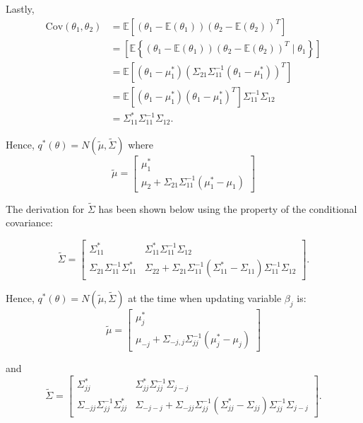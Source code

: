 \noindent Lastly,
$$
\begin{array}{rl}
	\mbox{Cov}(\theta_1,\theta_2) 
	&  = \mathbb{E}[(\theta_1 - \mathbb{E}(\theta_1))(\theta_2 - \mathbb{E}(\theta_2))^T] 
	\\ [2ex]
	&  = \left[ \mathbb{E}\left\{ (\theta_1 - \mathbb{E}(\theta_1))(\theta_2 - \mathbb{E}(\theta_2))^T \mid \theta_1 \right\} \right]     \\ [2ex]
	& = \mathbb{E}\left[ \left(\theta_1 - \mu_1^* \right)\left(  \Sigma_{21}\Sigma_{11}^{-1}(\theta_1 - \mu_1^*)    \right)^T\right] 
	\\ [2ex]
	&  = \mathbb{E}\left[ \left(\theta_1 - \mu_1^* \right)\left(  \theta_1 - \mu_1^* \right)^T\right] \Sigma_{11}^{-1}\Sigma_{12}
	\\ [2ex]
	&  = \Sigma_{11}^* \Sigma_{11}^{-1}\Sigma_{12}.
\end{array} 
$$

\noindent Hence, $q^*(\theta) = N(\widetilde{\mu},\widetilde{\Sigma})$ where
$$
\widetilde{\mu} =
\left[ \begin{array}{c}
	\mu_1^* \\
	\mu_2 + \Sigma_{21}\Sigma_{11}^{-1}\left(\mu_1^* - \mu_1\right)
\end{array} \right]
$$

The derivation for $\tilde{\Sigma}$ has been shown below using the property of the conditional covariance:

$$
\widetilde{\Sigma} = 
\left[ \begin{array}{cc}
	\Sigma_{11}^* & \Sigma_{11}^* \Sigma_{11}^{-1}\Sigma_{12} \\
	\Sigma_{21}  \Sigma_{11}^{-1}\Sigma_{11}^* & \Sigma_{22} 
	+ \Sigma_{21}\Sigma_{11}^{-1}  ( \Sigma_{11}^* -\Sigma_{11})  \Sigma_{11}^{-1} \Sigma_{12}
\end{array} \right].
$$




\noindent Hence, $q^*(\theta) = N(\widetilde{\mu},\widetilde{\Sigma})$ at the time when updating variable $\beta_j$ is:
\begin{equation}
	\label{eq:LG_mu}
	\widetilde{\mu} =
	\left[ \begin{array}{c}
		\mu_j^* \\
		\mu_{-j} + \Sigma_{-j,j}\Sigma_{jj}^{-1}\left(\mu_j^* - \mu_j\right)
	\end{array} \right]
\end{equation}

\noindent and
\begin{equation}
	\label{eq:LG_sigma}
	\widetilde{\Sigma} = 
	\left[ \begin{array}{cc}
		\Sigma_{jj}^* & \Sigma_{jj}^* \Sigma_{jj}^{-1}\Sigma_{j-j} \\
		\Sigma_{-jj}  \Sigma_{jj}^{-1}\Sigma_{jj}^* & \Sigma_{-j-j} 
		+ \Sigma_{-jj}\Sigma_{jj}^{-1}  ( \Sigma_{jj}^* -\Sigma_{jj})  \Sigma_{jj}^{-1} \Sigma_{j-j}
	\end{array} \right].
\end{equation}


